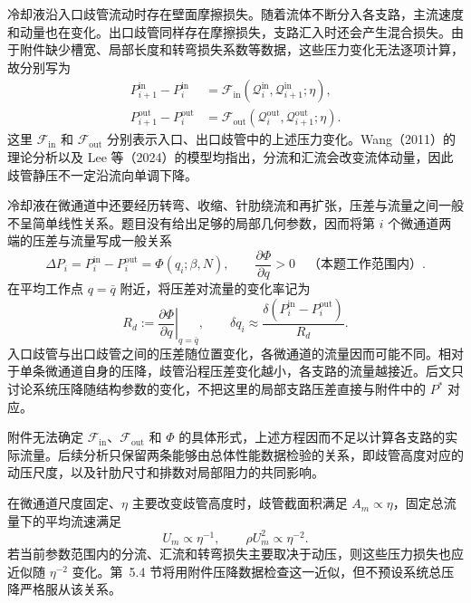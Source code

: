 \documentclass[withoutpreface,bwprint]{cumcmthesis}
\newcommand{\Pstar}{P^{*}}
\begin{document}
冷却液沿入口歧管流动时存在壁面摩擦损失。随着流体不断分入各支路，主流速度和动量也在变化。出口歧管同样存在摩擦损失，支路汇入时还会产生混合损失。由于附件缺少槽宽、局部长度和转弯损失系数等数据，这些压力变化无法逐项计算，故分别写为
\begin{equation}
\begin{aligned}
P_{i+1}^{\mathrm{in}}-P_i^{\mathrm{in}}
&=\mathcal F_{\mathrm{in}}\!\left(\mathcal Q_i^{\mathrm{in}},
\mathcal Q_{i+1}^{\mathrm{in}};\eta\right),\\
P_{i+1}^{\mathrm{out}}-P_i^{\mathrm{out}}
&=\mathcal F_{\mathrm{out}}\!\left(\mathcal Q_i^{\mathrm{out}},
\mathcal Q_{i+1}^{\mathrm{out}};\eta\right).
\end{aligned}
\label{eq:dual-manifold-pressure}
\end{equation}
这里 $\mathcal F_{\mathrm{in}}$ 和 $\mathcal F_{\mathrm{out}}$ 分别表示入口、出口歧管中的上述压力变化。Wang（2011）的理论分析以及 Lee 等（2024）的模型均指出，分流和汇流会改变流体动量，因此歧管静压不一定沿流向单调下降\cite{Wang2011,Lee2024}。

冷却液在微通道中还要经历转弯、收缩、针肋绕流和再扩张，压差与流量之间一般不呈简单线性关系\cite{Lee2024}。题目没有给出足够的局部几何参数，因而将第 $i$ 个微通道两端的压差与流量写成一般关系
\begin{equation}
\Delta P_i=P_i^{\mathrm{in}}-P_i^{\mathrm{out}}
=\Phi(q_i;\beta,N),
\qquad \frac{\partial\Phi}{\partial q}>0
\quad\text{（本题工作范围内）}.
\label{eq:branch-pressure}
\end{equation}
在平均工作点 $q=\bar q$ 附近，将压差对流量的变化率记为
\begin{equation}
R_d:=\left.\frac{\partial\Phi}{\partial q}\right|_{q=\bar q},
\qquad
\delta q_i\approx
\frac{\delta(P_i^{\mathrm{in}}-P_i^{\mathrm{out}})}{R_d}.
\label{eq:branch-linearization}
\end{equation}
入口歧管与出口歧管之间的压差随位置变化，各微通道的流量因而可能不同。相对于单条微通道自身的压降，歧管沿程压差变化越小，各支路的流量越接近。后文只讨论系统压降随结构参数的变化，不把这里的局部支路压差直接与附件中的 $\Pstar$ 对应。

附件无法确定 $\mathcal F_{\mathrm{in}}$、$\mathcal F_{\mathrm{out}}$ 和 $\Phi$ 的具体形式，上述方程因而不足以计算各支路的实际流量。后续分析只保留两条能够由总体性能数据检验的关系，即歧管高度对应的动压尺度，以及针肋尺寸和排数对局部阻力的共同影响。

在微通道尺度固定、$\eta$ 主要改变歧管高度时，歧管截面积满足 $A_m\propto\eta$，固定总流量下的平均流速满足
\begin{equation}
U_m\propto\eta^{-1},\qquad \rho U_m^2\propto\eta^{-2}.
\label{eq:eta-scale}
\end{equation}
若当前参数范围内的分流、汇流和转弯损失主要取决于动压，则这些压力损失也应近似随 $\eta^{-2}$ 变化。第~5.4 节将用附件压降数据检查这一近似，但不预设系统总压降严格服从该关系。
\end{document}
